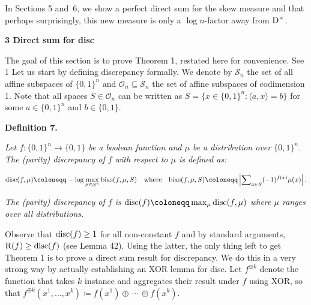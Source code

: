 \documentclass[10pt,a4paper]{article}
\begin{document}
In Sections 5 and 6, we show a perfect direct sum for the skew measure and that perhaps surprisingly, this new measure is only a $\log n$-factor away from ${\textup{D}}^{\times}$.\par






\par\medskip\noindent\textbf{
3 Direct sum for disc
}\par




The goal of this section is to prove Theorem 1, restated here for convenience.
See 1
Let us start by defining discrepancy formally. We denote by $\mathcal{S}_{n}$ the set of all affine subspaces of $\{0,1\}^{n}$ and $\mathcal{O}_{n}\subseteq\mathcal{S}_{n}$ the set of affine subspaces of codimension 1. Note that all spaces $S\in\mathcal{O}_{n}$ can be written as $S=\{x\in\{0,1\}^{n}:\langle a,x\rangle=b\}$ for some $a\in\{0,1\}^{n}$ and $b\in\{0,1\}$.\par





\par\medskip\noindent\textbf{
\textbf{Definition 7}\textbf{.}
}\par



\emph{Let $f\colon\{0,1\}^{n}\to\{0,1\}$ be a boolean function and $\mu$ be a distribution over $\{0,1\}^{n}$. The (parity) discrepancy of $f$ with respect to $\mu$ is defined as:}\par


\[\begin{gathered}
{\textup{disc}}(f,\mu)\coloneqq-\log\max_{S\in\mathcal{S}^{n}}{\textup{bias}}(f,\mu,S)\quad\text{where}\quad{\textup{bias}}(f,\mu,S)\coloneqq\left|\sum\nolimits_{x\in S}(-1)^{f(x)}\mu(x)\right|.
\end{gathered}\]


\emph{The (parity) discrepancy of $f$ is ${\textup{disc}}(f)\coloneqq\max_{\mu}{\textup{disc}}(f,\mu)$ where $\mu$ ranges over all distributions.}\par






Observe that ${\textup{disc}}(f)\geq 1$ for all non-constant $f$ and by standard arguments, ${\textup{R}}(f)\geq{\textup{disc}}(f)$ (see Lemma 42). Using the latter, the only thing left to get Theorem 1 is to prove a direct sum result for discrepancy. We do this in a very strong way by actually establishing an XOR lemma for disc. Let $f^{\oplus k}$ denote the function that takes $k$ instance and aggregates their result under $f$ using XOR, so that $f^{\oplus k}(x^{1},\dots,x^{k})\coloneqq f(x^{1})\oplus\,\cdots\,\oplus f(x^{k})$.\par
\end{document}
